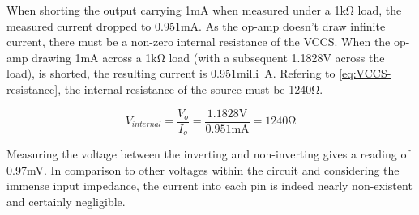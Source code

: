 When shorting the output carrying 1\si{\milli\ampere} when measured under a 1\si{\kilo\ohm} load, the measured current dropped to 0.951\si{\milli\ampere}. As the op-amp doesn't draw infinite current, there must be a non-zero internal resistance of the VCCS. When the op-amp drawing 1\si{\milli\ampere} across a 1\si{\kilo\ohm} load (with a subsequent 1.1828\si{\volt} across the load), is shorted, the resulting current is 0.951\si{milli\ampere}. Refering to \eqref{eq:VCCS-resistance}, the internal resistance of the source must be 1240\si{\ohm}.

\begin{equation}
	V_{internal} = \frac{V_o}{I_o} = \frac{1.1828\si{\volt}}{0.951\si{\milli\ampere}} = 1240\si{\ohm}
	\label{eq:VCCS-resistance}
\end{equation}



Measuring the voltage between the inverting and non-inverting gives a reading of 0.97\si{\milli\volt}. In comparison to other voltages within the circuit and considering the immense input impedance, the current into each pin is indeed nearly non-existent and certainly negligible.

